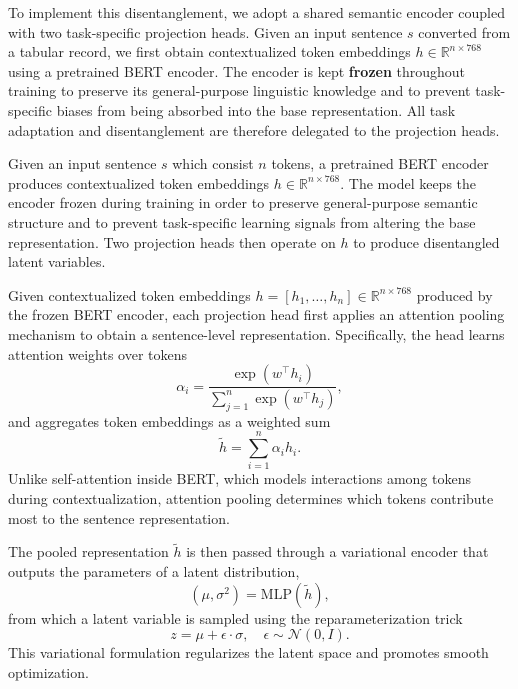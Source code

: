 \documentclass[runningheads]{llncs}
\begin{document}
To implement this disentanglement, we adopt a shared semantic encoder coupled with two task-specific projection heads. Given an input sentence $s$ converted from a tabular record, we first obtain contextualized token embeddings $h \in \mathbb{R}^{n \times 768}$ using a pretrained BERT encoder. The encoder is kept \textbf{frozen} throughout training to preserve its general-purpose linguistic knowledge and to prevent task-specific biases from being absorbed into the base representation. All task adaptation and disentanglement are therefore delegated to the projection heads. 


Given an input sentence $s$ which consist $n$ tokens, a pretrained BERT encoder produces contextualized token embeddings
$h \in \mathbb{R}^{n \times 768}$.
The model keeps the encoder frozen during training in order to preserve general-purpose semantic
structure and to prevent task-specific learning signals from altering the base representation.
Two projection heads then operate on $h$ to produce disentangled latent variables.

Given contextualized token embeddings $h = [h_1,\ldots,h_n] \in \mathbb{R}^{n \times 768}$ produced by
the frozen BERT encoder, each projection head first applies an attention pooling mechanism to obtain
a sentence-level representation.
Specifically, the head learns attention weights over tokens
\begin{equation}
\alpha_i = \frac{\exp(w^\top h_i)}{\sum_{j=1}^n \exp(w^\top h_j)},
\end{equation}
and aggregates token embeddings as a weighted sum
\begin{equation}
\tilde{h} = \sum_{i=1}^n \alpha_i h_i.
\end{equation}
Unlike self-attention inside BERT, which models interactions among tokens during contextualization,
attention pooling determines which tokens contribute most to the sentence representation.

The pooled representation $\tilde{h}$ is then passed through a variational encoder that outputs the
parameters of a latent distribution,
\begin{equation}
(\mu, \sigma^2) = \mathrm{MLP}(\tilde{h}),
\end{equation}
from which a latent variable is sampled using the reparameterization trick
\begin{equation}
z = \mu + \epsilon \cdot \sigma, \quad \epsilon \sim \mathcal{N}(0, I).
\end{equation}
This variational formulation regularizes the latent space and promotes smooth optimization.
\end{document}
